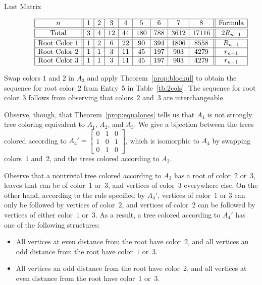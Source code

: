 \documentclass[12pt]{amsart}
\begin{document}
\begin{description}
\begin{description}
        \item[Last Matrix]\hspace*{\fill}\vspace{-0.5cm}
        \begin{center}
            \[
            \begin{array}{|c||c|c|c|c|c|c|c|c||c|}\hline
               n  & 1 & 2 & 3 & 4 & 5 & 6 & 7 & 8  & \text{Formula}\\\hline\hline
               \text{Total}  & 3 & 4 & 12 & 44 & 180 & 788 & 3612 & 17116 & 2R_{n-1}\\\hline\hline
               \text{Root Color }1 & 1 & 2 & 6 & 22 & 90 & 394 & 1806 & 8558 & R_{n-1}\\\hline
               \text{Root Color }2 & 1 & 1 & 3 & 11 & 45 & 197 & 903 & 4279 & r_{n-1}\\\hline
               \text{Root Color }3 & 1 & 1 & 3 & 11 & 45 & 197 & 903 & 4279 & r_{n-1}\\\hline
            \end{array}
            \]
        \end{center}
    \end{description}
    
   
    \item[Discussion]
    Swap colors $1$ and $2$ in $A_3$ and apply Theorem~\ref{prop:blockul} to obtain the sequence for root color~$2$ from Entry~5 in Table~\ref{tb:2cols}. The sequence for root color~$3$ follows from observing that colors~$2$ and~$3$ are interchangeable.
    
    
   
     Observe, though, that Theorem~\ref{prop:equalones} tells us that $A_4$ is not strongly tree coloring equivalent to $A_1$, $A_2$, and $A_3$.
    We give a bijection between the trees colored according to $A_{4}' = \begin{bmatrix}
    0 & 1 & 0 \\
    1 & 0 & 1 \\
    0 & 1 & 0
    \end{bmatrix}$, which is isomorphic to $A_4$ by swapping colors~$1$ and~$2$, and the trees colored according to $A_3$.
   
    
    Observe that a nontrivial tree colored according to $A_3$ has a root of color~$2$ or~$3$, leaves that can be of color~$1$ or~$3$, and vertices of color~$3$ everywhere else. On the other hand, according to the rule specified by $A_{4}'$, vertices of color~$1$ or $3$ can only be followed by vertices of color~$2$, and vertices of color~$2$ can be followed by vertices of either color~$1$ or~$3$. As a result, a tree colored according to $A_{4}'$ has one of the following structures:
    \begin{itemize}
        \item All vertices at even distance from the root have color~$2$, and all vertices an odd distance from the root have color~$1$ or~$3$.
        \item All vertices an odd distance from the root have color~$2$, and all vertices at even distance from the root have color~$1$ or~$3$.
    \end{itemize}
    

\end{description}
\end{document}
